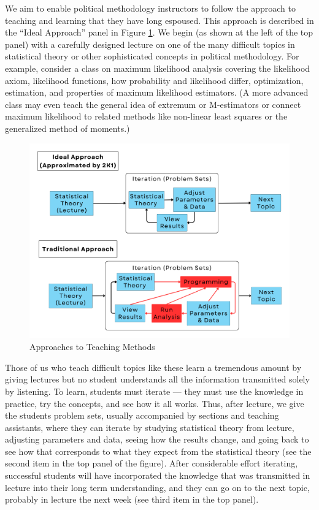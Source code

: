 \documentclass[12pt]{article}
\theoremstyle{definition}
\begin{document}
We aim to enable political methodology instructors to follow the approach to teaching and learning that they have long espoused.  This approach is described in the ``Ideal Approach'' panel in Figure \ref{ov}.  We begin (as shown at the left of the top panel) with a carefully designed lecture on one of the many difficult topics in statistical theory or other sophisticated concepts in political methodology. For example, consider a class on maximum likelihood analysis covering the likelihood axiom, likelihood functions, how probability and likelihood differ, optimization, estimation, and properties of maximum likelihood estimators. (A more advanced class may even teach the general idea of extremum or M-estimators or connect maximum likelihood to related methods like non-linear least squares or the generalized method of moments.)
\begin{figure}[htb]
  \begin{center}
  \includegraphics[width=\linewidth]{2}    
  \caption{Approaches to Teaching Methods}
  \end{center}
  \label{ov}
\end{figure}

Those of us who teach difficult topics like these learn a tremendous amount by giving lectures but no student understands all the information transmitted solely by listening. To learn, students must iterate --- they must use the knowledge in practice, try the concepts, and see how it all works. Thus, after lecture, we give the students problem sets, usually accompanied by sections and teaching assistants, where they can iterate by studying statistical theory from lecture, adjusting parameters and data, seeing how the results change, and going back to see how that corresponds to what they expect from the statistical theory (see the second item in the top panel of the figure).  After considerable effort iterating, successful students will have incorporated the knowledge that was transmitted in lecture into their long term understanding, and they can go on to the next topic, probably in lecture the next week (see third item in the top panel).
\end{document}
